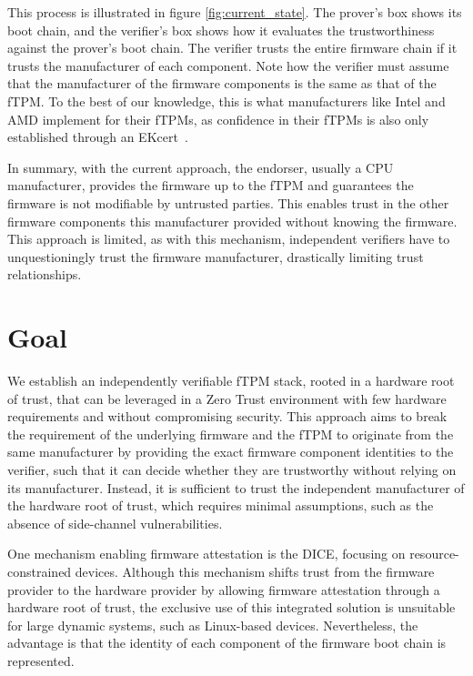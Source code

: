 

This process is illustrated in figure \autoref{fig:current_state}.
The prover's box shows its boot chain, and the verifier's box shows how it evaluates the trustworthiness against the prover's boot chain.
The verifier trusts the entire firmware chain if it trusts the manufacturer of each component.
Note how the verifier must assume that the manufacturer of the firmware components is the same as that of the fTPM\@.
To the best of our knowledge, this is what manufacturers like Intel and AMD implement for their \acp{fTPM}, as confidence in their \acp{fTPM} is also only established through an EKcert~\cite{Ruan2014}.


In summary, with the current approach, the endorser, usually a CPU manufacturer, provides the firmware up to the fTPM and guarantees the firmware is not modifiable by untrusted parties.
This enables trust in the other firmware components this manufacturer provided without knowing the firmware.
This approach is limited, as with this mechanism, independent verifiers have to unquestioningly trust the firmware manufacturer, drastically limiting trust relationships.

\section{Goal}

We establish an independently verifiable fTPM stack, rooted in a hardware root of trust, that can be leveraged in a Zero Trust environment with few hardware requirements and without compromising security.
This approach aims to break the requirement of the underlying firmware and the fTPM to originate from the same manufacturer by providing the exact firmware component identities to the verifier, such that it can decide whether they are trustworthy without relying on its manufacturer.
Instead, it is sufficient to trust the independent manufacturer of the hardware root of trust, which requires minimal assumptions, such as the absence of side-channel vulnerabilities.


One mechanism enabling firmware attestation is the \ac{DICE}, focusing on resource-constrained devices.
Although this mechanism shifts trust from the firmware provider to the hardware provider by allowing firmware attestation through a hardware root of trust, the exclusive use of this integrated solution is unsuitable for large dynamic systems, such as Linux-based devices.
Nevertheless, the advantage is that the identity of each component of the firmware boot chain is represented.

